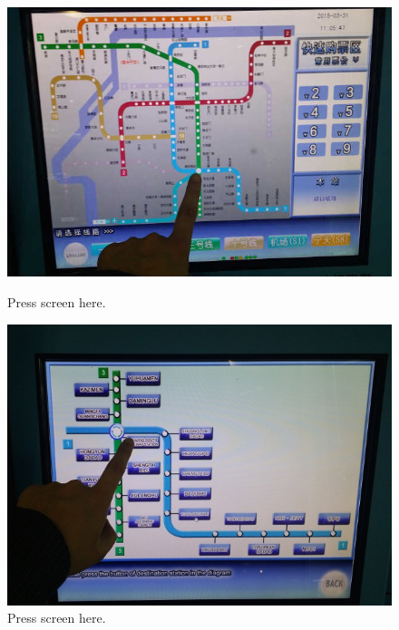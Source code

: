 \documentclass[11pt]{article}
\begin{document}
 \begin{figure}[!h]
	\begin{minipage}[t]{.5\textwidth}
     	\centering
        	\includegraphics[scale=0.27]{20150331_110548.jpg}
		\caption{Press screen here.\label{20150331_110548}}
	\end{minipage}%
     \begin{minipage}[t]{.5\textwidth}
         \centering
       	 \includegraphics[scale=0.27]{20150331_110629.jpg}
	 	 \caption{Press screen here.\label{20150331_110629}}
    \end{minipage}%
 \end{figure}
\end{document}

